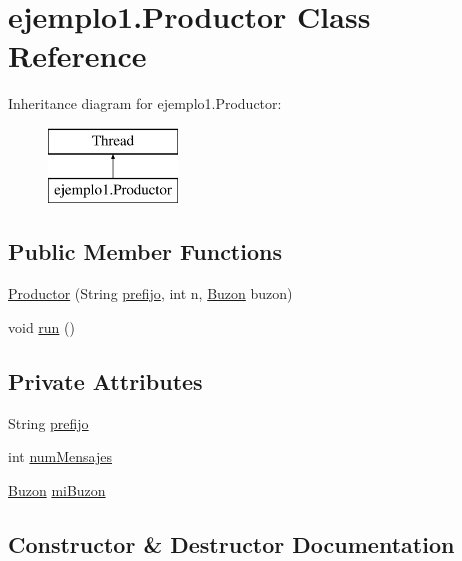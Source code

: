 \hypertarget{classejemplo1_1_1_productor}{}\section{ejemplo1.\+Productor Class Reference}
\label{classejemplo1_1_1_productor}
Inheritance diagram for ejemplo1.\+Productor\+:\begin{figure}[H]
\begin{center}
\leavevmode
\includegraphics[height=2.000000cm]{classejemplo1_1_1_productor}
\end{center}
\end{figure}
\subsection*{Public Member Functions}
\begin{DoxyCompactItemize}
\item 
\mbox{\hyperlink{classejemplo1_1_1_productor_a27592dd79d64eaa966be4a758b87b5ef}{Productor}} (String \mbox{\hyperlink{classejemplo1_1_1_productor_a205e5e4e819a322d2017fd816ac94d2d}{prefijo}}, int n, \mbox{\hyperlink{classejemplo1_1_1_buzon}{Buzon}} buzon)
\item 
void \mbox{\hyperlink{classejemplo1_1_1_productor_a813cc92fe486532214ebe9b626a39cd5}{run}} ()
\end{DoxyCompactItemize}
\subsection*{Private Attributes}
\begin{DoxyCompactItemize}
\item 
String \mbox{\hyperlink{classejemplo1_1_1_productor_a205e5e4e819a322d2017fd816ac94d2d}{prefijo}}
\item 
int \mbox{\hyperlink{classejemplo1_1_1_productor_a6be9757fc794b9da3639d7f4f1acef1a}{num\+Mensajes}}
\item 
\mbox{\hyperlink{classejemplo1_1_1_buzon}{Buzon}} \mbox{\hyperlink{classejemplo1_1_1_productor_a92dfbce31b3fc0ff14d36d51ba0619bd}{mi\+Buzon}}
\end{DoxyCompactItemize}


\subsection{Constructor \& Destructor Documentation}
\mbox{\label{classejemplo1_1_1_productor_a27592dd79d64eaa966be4a758b87b5ef}} 
